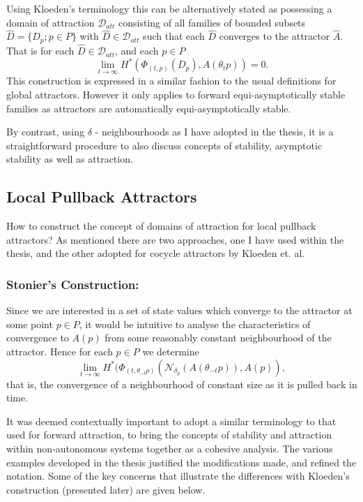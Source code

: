 \documentclass{article}
\begin{document}
Using Kloeden's terminology this can be alternatively stated as possessing a
domain of attraction $\mathcal{D}_{att}$ consisting of all families of bounded
subsets $\hat{D} = \{D_p ; p \in P \}$ with $\hat{D} \in \mathcal{D}_{att}$ such
that each $\hat{D}$ converges to the attractor $\hat{A}$. That is for each
$\hat{D} \in \mathcal{D}_{att}$, and each $p \in P$
\begin{equation}\label{dattdefn}
  \lim_{t \to \infty} H^*( \Phi_{(t, p)}(D_p), A(\theta_t p)) = 0.
\end{equation}
This construction is expressed in a similar fashion to the usual
definitions for global attractors. However it only applies to
forward equi-asymptotically stable families as attractors are
automatically equi-asymptotically stable.

By contrast, using $\delta$ - neighbourhoods as I have adopted in the
thesis, it is a straightforward procedure to also discuss concepts of
stability, asymptotic stability as well as attraction.

\subsection{Local Pullback Attractors}

How to construct the concept of domains of attraction for local pullback
attractors? As mentioned there are two approaches, one I have used within the
thesis, and the other adopted for cocycle attractors by Kloeden et. al.

\subsubsection{Stonier's Construction:}

Since we are interested in a set of state values which converge to
the attractor at some point $p \in P$, it would be intuitive to analyse the
characteristics of convergence to $A(p)$ from some reasonably constant
neighbourhood of the attractor. Hence for each $p \in P$ we determine
\[ \lim_{t \to \infty} H^*( \Phi_{(t,
        \theta_{-t}p)}(\mathcal{N}_{\delta_p}(A(\theta_{-t}p)), A(p)), \]
that is, the convergence of a neighbourhood of constant size as it is pulled
back in time.

It was deemed contextually important to adopt a similar terminology to that used
for forward attraction, to bring the concepts of stability and
attraction within non-autonomous systems together as a cohesive analysis.
The various examples developed in the thesis justified the modifications made,
and refined the notation. Some of the key concerns that illustrate the
differences with Kloeden's construction (presented later)  are given below.
\end{document}
